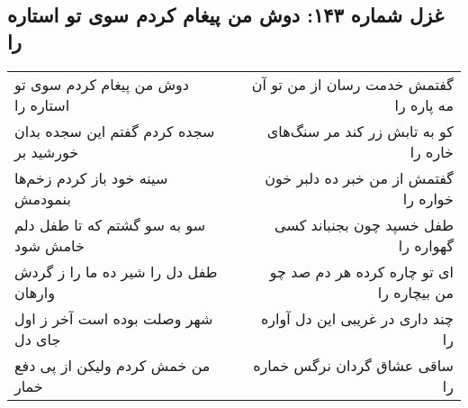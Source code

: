\begin{center}
\section*{غزل شماره ۱۴۳: دوش من پیغام کردم سوی تو استاره را}
\label{sec:0143}
\begin{longtable}{l p{0.5cm} r}
دوش من پیغام کردم سوی تو استاره را
&&
گفتمش خدمت رسان از من تو آن مه پاره را
\\
سجده کردم گفتم این سجده بدان خورشید بر
&&
کو به تابش زر کند مر سنگ‌های خاره را
\\
سینه خود باز کردم زخم‌ها بنمودمش
&&
گفتمش از من خبر ده دلبر خون خواره را
\\
سو به سو گشتم که تا طفل دلم خامش شود
&&
طفل خسپد چون بجنباند کسی گهواره را
\\
طفل دل را شیر ده ما را ز گردش وارهان
&&
ای تو چاره کرده هر دم صد چو من بیچاره را
\\
شهر وصلت بوده است آخر ز اول جای دل
&&
چند داری در غریبی این دل آواره را
\\
من خمش کردم ولیکن از پی دفع خمار
&&
ساقی عشاق گردان نرگس خماره را
\\
\end{longtable}
\end{center}
